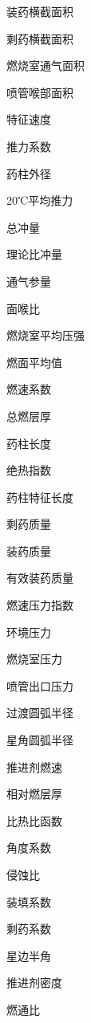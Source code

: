 
\begin{denotation}[3cm]
  \item[$A_{c}$] 装药横截面积
  \item[$A_{f}$] 剩药横截面积
  \item[$A_{p}$] 燃烧室通气面积
  \item[$A_{t}$] 喷管喉部面积
  \item[$C_{+20^\circ C}^*$] 特征速度
  \item[$C_{F+20^\circ C}$] 推力系数
  \item[$D$] 药柱外径
  \item[$\overline{F}_{+20^\circ C}$] 20℃平均推力
  \item[$I$] 总冲量
  \item[$I_{sp}$] 理论比冲量
  \item[$J$] 通气参量
  \item[$\overline{K_N}$] 面喉比
  \item[$\overline{P}_{+20^\circ C}$] 燃烧室平均压强
  \item[$\overline{S}$] 燃面平均值
  \item[$a$] 燃速系数
  \item[$e_{1}$] 总燃层厚
  \item[$L$] 药柱长度
  \item[$k$] 绝热指数
  \item[$l$] 药柱特征长度
  \item[$m_{f}$] 剩药质量
  \item[$m_{p}$] 装药质量
  \item[$m_{peff}$] 有效装药质量
  \item[$n$] 燃速压力指数
  \item[$p_{a}$] 环境压力
  \item[$p_{c}$] 燃烧室压力
  \item[$p_{e}$] 喷管出口压力
  \item[$r$] 过渡圆弧半径
  \item[$r_{1}$] 星角圆弧半径
  \item[$r_{\fontsize{8}{14}\mbox{燃}}$] 推进剂燃速
  \item[$y$] 相对燃层厚
  \item[$\varGamma$] 比热比函数
  \item[$\varepsilon$] 角度系数
  \item[$\varepsilon_{\fontsize{8}{14}\selectfont\mbox{侵}}$] 侵蚀比
  \item[$\eta$] 装填系数
  \item[$\eta_{f}$] 剩药系数
  \item[$\theta/2$] 星边半角
  \item[$\rho_{P}$] 推进剂密度
  \item[$\varphi$] 燃通比
\end{denotation}



